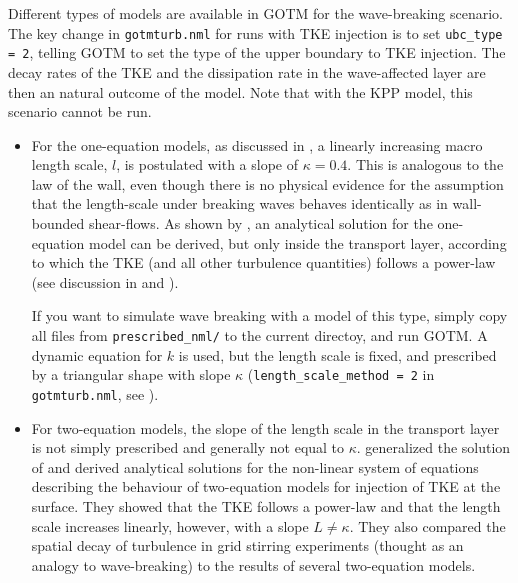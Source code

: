 Different types of models are available in GOTM for the wave-breaking
scenario. The key change in {\tt gotmturb.nml} for runs with TKE
injection is to set {\tt ubc\_type = 2}, telling GOTM to set the type
of the upper boundary to TKE injection. The decay rates of the TKE and
the dissipation rate in the wave-affected layer are then an natural
outcome of the model. Note that with the KPP model, this scenario
cannot be run.

\begin{itemize}

 \item For the one-equation models, as discussed in
 \cite{CraigBanner94}, a linearly increasing macro length scale, $l$,
 is postulated with a slope of $\kappa=0.4$. This is analogous to the
 law of the wall, even though there is no physical evidence for the
 assumption that the length-scale under breaking waves behaves
 identically as in wall-bounded shear-flows. As shown by
 \cite{CraigBanner94}, an analytical solution for the one-equation
 model can be derived, but only inside the transport layer, according
 to which the TKE (and all other turbulence quantities) follows a
 power-law (see discussion in  and
 ).

 If you want to simulate wave breaking with a model of this type,
 simply copy all files from {\tt prescribed\_nml/} to the current
 directoy, and run GOTM. A dynamic equation for $k$ is used, but the
 length scale is fixed, and prescribed by a triangular shape with slope
 $\kappa$ ({\tt length\_scale\_method = 2} in {\tt gotmturb.nml}, see
 ).

 \item For two-equation models, the slope of the length scale in the
 transport layer is not simply prescribed and generally not equal to
 $\kappa$. \cite{Umlaufetal2003} generalized the solution of
 \cite{CraigBanner94} and derived analytical solutions for the
 non-linear system of equations describing the behaviour of
 two-equation models for injection of TKE at the surface. They showed
 that the TKE follows a power-law and that the length scale increases
 linearly, however, with a slope $L \neq \kappa$. They also compared
 the spatial decay of turbulence in grid stirring experiments (thought
 as an analogy to wave-breaking) to the results of several
 two-equation models.


\end{itemize}
